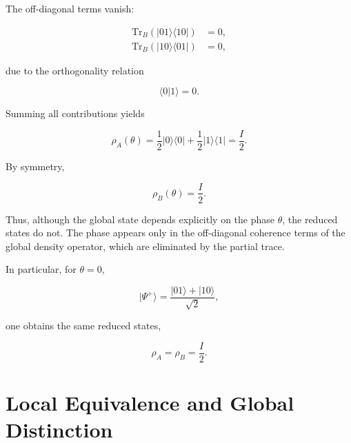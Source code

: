 The off-diagonal terms vanish:

\begin{align}
\mathrm{Tr}_B
\left(
|01\rangle\langle 10|
\right)
&=
0,
\nonumber
\\
\mathrm{Tr}_B
\left(
|10\rangle\langle 01|
\right)
&=
0,
\label{eq:appendix_partial_trace_offdiagonal}
\end{align}

due to the orthogonality relation

\[
\langle 0|1\rangle = 0.
\]

Summing all contributions yields

\begin{equation}
\rho_A(\theta)
=
\frac{1}{2}
|0\rangle\langle 0|
+
\frac{1}{2}
|1\rangle\langle 1|
=
\frac{I}{2}.
\label{eq:appendix_reduced_density_A}
\end{equation}

By symmetry,

\begin{equation}
\rho_B(\theta)
=
\frac{I}{2}.
\label{eq:appendix_reduced_density_B}
\end{equation}

Thus, although the global state depends explicitly on the phase \( \theta \), the reduced states do not. The phase appears only in the off-diagonal coherence terms of the global density operator, which are eliminated by the partial trace.

\medskip

In particular, for \( \theta = 0 \),

\begin{equation}
|\Psi^+\rangle
=
\frac{
|01\rangle
+
|10\rangle
}{
\sqrt{2}
},
\label{eq:appendix_standard_bell_state}
\end{equation}

one obtains the same reduced states,

\begin{equation}
\rho_A
=
\rho_B
=
\frac{I}{2}.
\label{eq:appendix_standard_bell_reduced}
\end{equation}


\section{Local Equivalence and Global Distinction}

